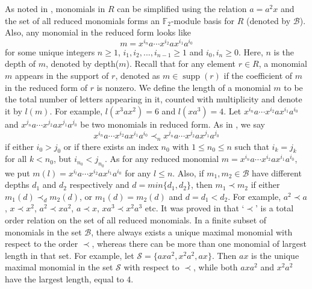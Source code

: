 \documentclass[12pt]{article}
\theoremstyle{plain}
\theoremstyle{definition}
\begin{document}
	\vspace{3mm}
	As noted in \cite{Dit}, monomials in $R$ can be simplified using the relation $a=a^2x$ and the set of all reduced monomials forms an $\mathbb{F}_2$-module basis for $R$ (denoted by $\mathcal{B}$). Also, any monomial in the reduced form looks like $$ m= x^{i_{n}}a\cdots x^{i_{2}}ax^{i_1}a^{i_0}$$
	for some unique integers $n \geq1$, $i_1, i_2,..., i_{n-1} \geq 1$ and $i_0, i_n \geq 0$. Here, $n$ is the depth of $m$, denoted by depth($m$). Recall that for any element $r \in R$, a monomial $m$ appears in the support of $r$, denoted as $m \in \operatorname{supp}(r)$ if the coefficient of $m$ in the reduced form of $r$ is nonzero. We define the length of a monomial $m$ to be the total number of letters appearing in it, counted with multiplicity and denote it by $l(m)$. For example, $l(x^3ax^2) = 6$ and $l(xa^3) = 4$. Let $x^{i_{n}}a\cdots x^{i_{2}}ax^{i_1}a^{i_0}$ and $x^{j_{n}}a\cdots x^{j_{2}}ax^{j_1}a^{j_0}$ be two monomials in reduced form. As in \cite{Dit}, we say $$x^{i_{n}}a\cdots x^{i_{2}}ax^{i_1}a^{i_0} \prec_n  x^{j_{n}}a\cdots x^{j_{2}}ax^{j_1}a^{j_0}$$ if
	either $i_0 > j_0$ or if there exists an index $n_0$ with $1 \leq n_0 \leq n$ such that $i_k=j_k$ for all $k < n_0$, but $i_{n_0} < j_{n_0}$. As for any reduced monomial $m = x^{i_{n}}a\cdots x^{i_{2}}ax^{i_1}a^{i_0}$, we put $m(l) =x^{i_{l}}a\cdots x^{i_{2}}ax^{i_1}a^{i_0}$ for any $l \leq n$.  Also, if $m_1, m_2 \in \mathcal{B}$ have different depths $d_1$ and $d_2$ respectively and $d=min \{d_1,d_2\}$, then $m_1 \prec m_2$ if either $m_1(d) \prec_d m_2(d)$, or $m_1(d)=m_2(d)$ and $d=d_1 < d_2$. For example, $a^2 \prec a$, $x \prec x^2$, $a^2 \prec xa^2$, $a \prec x$, $xa^3 \prec x^2a^3$ etc. It was proved in \cite[Lemma 2.1]{Dit} that  `$\prec$' is a total order relation on the set of all reduced monomials. In a finite subset of monomials in the set $\mathcal{B}$, there always exists a unique maximal monomial with respect to the order $\prec$, whereas there can be more than one monomial of largest length in that set. For example, let $\mathcal{S}=\{axa^2, x^2a^2,ax\}$. Then $ax$ is the unique maximal monomial in the set $\mathcal{S}$ with respect to $\prec$, while both $axa^2$ and $x^2a^2$ have the largest length, equal to $4$.
	
\end{document}

